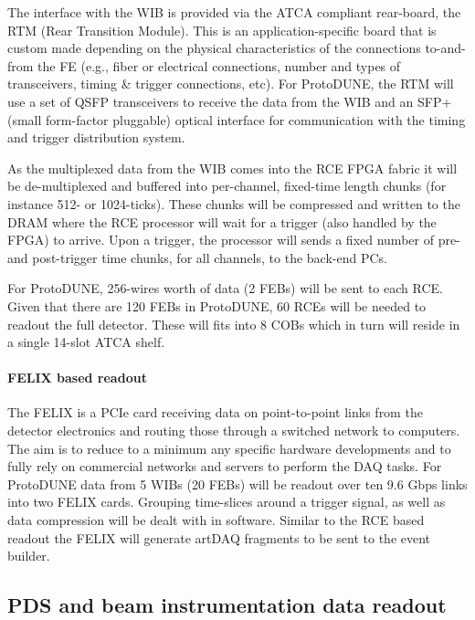 The interface with the WIB is provided via the ATCA compliant rear-board, the RTM (Rear Transition Module).  
This is an application-specific board
that is custom made depending on the physical characteristics of the
connections to-and-from the FE (e.g., fiber or electrical connections,
number and types of transceivers, timing \& trigger connections, etc).
For ProtoDUNE, the RTM will use a set of QSFP transceivers to receive
the data from the WIB and an SFP+ (small form-factor pluggable)
 optical interface for communication
with the timing and trigger distribution system.

As the multiplexed data from the WIB comes into the RCE FPGA fabric
it will be de-multiplexed and buffered into per-channel, fixed-time
length chunks (for instance 512- or 1024-ticks).  These chunks will be
compressed and written to the DRAM where the RCE processor will wait
for a trigger (also handled by the FPGA) to arrive.  Upon a trigger, the
processor will sends a fixed number of pre- and post-trigger time chunks,
for all channels, to the back-end PCs.  

For ProtoDUNE, 256-wires worth of data (2 FEBs) will be sent to each RCE.
Given that there are 120 FEBs in ProtoDUNE, 60 RCEs will be needed to
readout the full detector.  These will fits into 8 COBs which in turn
will reside in a single 14-slot ATCA shelf.

\paragraph{FELIX based readout}
The FELIX is a PCIe card receiving data on point-to-point links from
the detector electronics and routing those through a switched network
to computers.  The aim is to reduce to a minimum any specific hardware
developments and to fully rely on commercial networks and servers to
perform the DAQ tasks.  For ProtoDUNE data from 5 WIBs (20 FEBs) will
be readout over ten 9.6 Gbps links into two FELIX cards.  Grouping
time-slices around a trigger signal, as well as data compression will be
dealt with in software. Similar to the RCE based readout the FELIX will
generate artDAQ fragments to be sent to the event builder.


\subsection{PDS and beam instrumentation data readout}

